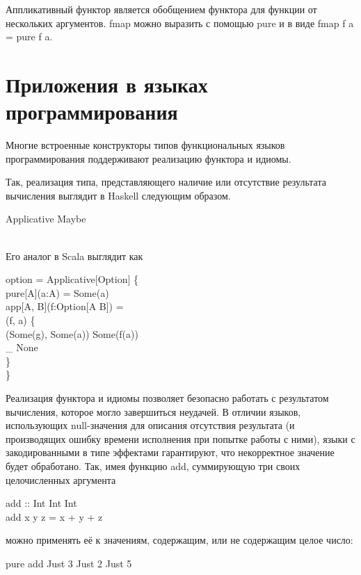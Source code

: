 Аппликативный функтор является обобщением функтора для функции от нескольких аргументов. \<fmap\> можно выразить с помощью \<pure\> и \<\circledast\> в виде \<fmap f a = pure f \circledast a\>.

\section{Приложения в языках программирования}\label{subsec:idioms-app}
Многие встроенные конструкторы типов функциональных языков программирования поддерживают реализацию функтора и идиомы.

Так, реализация типа, представляющего наличие или отсутствие результата вычисления выглядит в Haskell следующим образом.

\begin{haskell}
 Applicative Maybe \\
\\
\quad{}
\end{haskell}

Его аналог в Scala выглядит как

\begin{haskell}
 option =  Applicative[Option] \{ \\
\quad{} pure[A](a:A) = Some(a)\\
\quad{} app[A, B](f:Option[A \Rightarrow B]) = \\
\quad{} \Rightarrow (f, a)  \{\\
\quad\quad\quad{} (Some(g), Some(a)) \Rightarrow Some(f(a))\\
\quad\quad\quad{} \_ \Rightarrow None\\
\quad\quad\}\\
\}
\end{haskell}

Реализация функтора и идиомы позволяет безопасно работать с результатом вычисления, которое могло завершиться неудачей. В отличии языков, использующих \<null\>-значения для описания отсутствия результата (и производящих ошибку времени исполнения при попытке работы с ними), языки с закодированными в типе эффектами гарантируют, что некорректное значение будет обработано. Так, имея функцию \<add\>, суммирующую три своих целочисленных аргумента

\begin{haskell}
add :: Int \to Int \to Int \\
add x y z = x + y + z
\end{haskell}
\hspace{0cm}можно применять её к значениям, содержащим, или не содержащим целое число: 
\begin{haskell}
pure add \circledast Just 3 \circledast Just 2 \circledast Just 5
\end{haskell}


